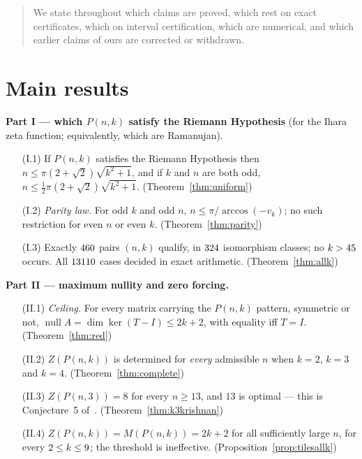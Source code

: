 \documentclass[11pt]{article}
\theoremstyle{definition}
\begin{document}
\begin{abstract}
We state throughout which claims are proved, which rest on exact certificates,
which on interval certification, which are numerical, and which earlier claims of
ours are corrected or withdrawn.
\end{abstract}

\section*{Main results}

\noindent\textbf{Part I --- which $P(n,k)$ satisfy the Riemann Hypothesis}
(for the Ihara zeta function; equivalently, which are Ramanujan).

\begin{enumerate}\setlength{\itemsep}{2pt}
\item[(I.1)] If $P(n,k)$ satisfies the Riemann Hypothesis then
  $n\le\pi(2+\sqrt2)\sqrt{k^2+1}$, and if $k$ and $n$ are both odd,
  $n\le\tfrac12\pi(2+\sqrt2)\sqrt{k^2+1}$. \hfill (Theorem~\ref{thm:uniform})
\item[(I.2)] \emph{Parity law.} For odd $k$ and odd $n$,
  $n\le\pi/\arccos(-v_k)$; no such restriction for even $n$ or even $k$.
  \hfill (Theorem~\ref{thm:parity})
\item[(I.3)] Exactly $460$ pairs $(n,k)$ qualify, in $324$
  isomorphism classes; no $k>45$ occurs. All $13110$ cases
  decided in exact arithmetic. \hfill (Theorem~\ref{thm:allk})
\end{enumerate}

\medskip\noindent\textbf{Part II --- maximum nullity and zero forcing.}

\begin{enumerate}\setlength{\itemsep}{2pt}
\item[(II.1)] \emph{Ceiling.} For every matrix carrying the $P(n,k)$ pattern,
  symmetric or not, $\operatorname{null}A=\dim\ker(T-I)\le2k+2$, with equality
  iff $T=I$. \hfill (Theorem~\ref{thm:red})
\item[(II.2)] $Z(P(n,k))$ is determined for \emph{every} admissible $n$ when
  $k=2$, $k=3$ and $k=4$. \hfill (Theorem~\ref{thm:complete})
\item[(II.3)] $Z(P(n,3))=8$ for every $n\ge13$, and $13$ is optimal --- this is
  Conjecture~5 of~\cite{K}. \hfill (Theorem~\ref{thm:k3krishnan})
\item[(II.4)] $Z(P(n,k))=M(P(n,k))=2k+2$ for all sufficiently large $n$, for
  every $2\le k\le9$; the threshold is ineffective.
  \hfill (Proposition~\ref{prop:tilesallk})
\end{enumerate}
\end{document}
